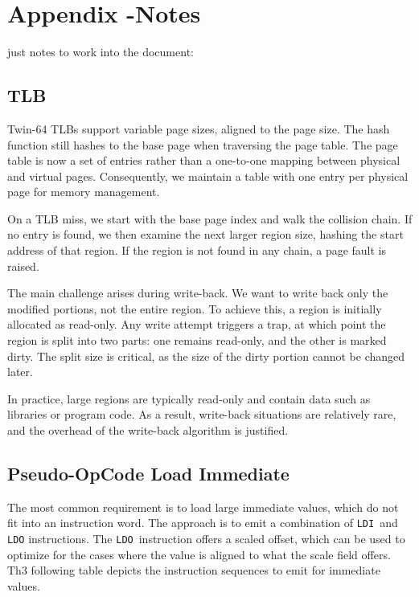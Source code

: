 \chapter*{Appendix -Notes}

just notes to work into the document:


\section*{TLB}

Twin-64 TLBs support variable page sizes, aligned to the page size. The hash function still hashes to the base page when traversing the page table. The page table is now a set of entries rather than a one-to-one mapping between physical and virtual pages. Consequently, we maintain a table with one entry per physical page for memory management.

On a TLB miss, we start with the base page index and walk the collision chain. If no entry is found, we then examine the next larger region size, hashing the start address of that region. If the region is not found in any chain, a page fault is raised.

The main challenge arises during write-back. We want to write back only the modified portions, not the entire region. To achieve this, a region is initially allocated as read-only. Any write attempt triggers a trap, at which point the region is split into two parts: one remains read-only, and the other is marked dirty. The split size is critical, as the size of the dirty portion cannot be changed later.

In practice, large regions are typically read-only and contain data such as libraries or program code. As a result, write-back situations are relatively rare, and the overhead of the write-back algorithm is justified. 

\section*{Pseudo-OpCode Load Immediate}
The most common requirement is to load large immediate values, which do not fit into an instruction word. The approach is to emit a combination of \texttt{LDI} and \texttt{LDO} instructions. The \texttt{LDO} instruction offers a scaled offset, which can be used to optimize for the cases where the value is aligned to what the scale field offers. Th3 following table depicts the instruction sequences to emit for immediate values.

